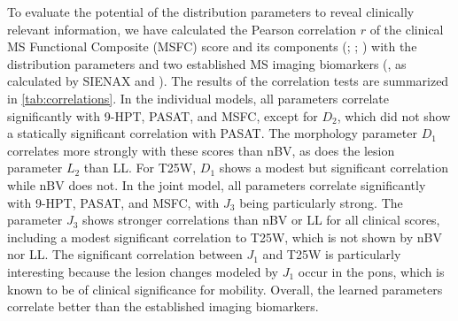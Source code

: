 To evaluate the potential of the distribution parameters to reveal clinically
relevant information, we have calculated the Pearson correlation $r$ of the
clinical MS Functional Composite (MSFC) score \citep{fischer1999} and its
components (; ; ) with
the distribution parameters and two established MS imaging biomarkers
(, as calculated by SIENAX
\citep{smith2002} and ). The results of the
correlation tests are summarized in \ref{tab:correlations}. In the individual
models, all parameters correlate significantly with 9-HPT, PASAT, and MSFC,
except for $D_2$, which did not show a statically significant correlation with
PASAT. The morphology parameter $D_1$ correlates more strongly with these scores
than nBV, as does the lesion parameter $L_2$ than LL. For T25W, $D_1$ shows a
modest but significant correlation while nBV does not. In the joint model, all
parameters correlate significantly with 9-HPT, PASAT, and MSFC, with $J_3$ being
particularly strong. The parameter $J_3$ shows stronger correlations than nBV or
LL for all clinical scores, including a modest significant correlation to T25W,
which is not shown by nBV nor LL. The significant correlation between $J_1$ and
T25W is particularly interesting because the lesion changes modeled by $J_1$
occur in the pons, which is known to be of clinical significance for mobility.
Overall, the learned parameters correlate better than the established imaging
biomarkers.

